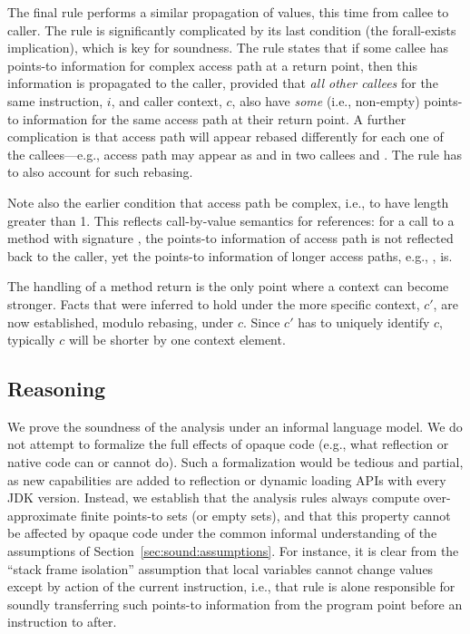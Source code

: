 The final rule performs a similar propagation of values, this time from callee to caller. The rule is significantly complicated by its last condition (the forall-exists implication), which is key for soundness. The rule states that if some callee has points-to information for complex access path  at a return point, then this information is propagated to the caller, provided that \todo{} \emph{all other callees} for the same instruction, $i$, and caller context, $c$, also have \emph{some} (i.e., non-empty) points-to information for the same access path  at their return point. A further complication is that access path  will appear rebased differently for each one of the callees---e.g., access path  may appear as  and  in two callees  and . The rule has to also account for such rebasing.

Note also the earlier condition that access path  be complex, i.e., to have length greater than 1. This reflects call-by-value semantics for references: for a call  to a method with signature , the points-to information of access path  is not reflected back to the caller, yet the points-to information of longer access paths, e.g., , is.

The handling of a method return is the only point where a context can become stronger. Facts that were inferred to hold under the more specific context, $c'$, are now established, modulo rebasing, under $c$. Since $c'$ has to uniquely identify $c$, typically $c$ will be shorter by one context element.


\subsection{Reasoning}
\label{sec:sound:reasoning}

We prove the soundness of the analysis under an informal language model. We do not attempt to formalize the full effects of opaque code (e.g., what reflection or native code can or cannot do). Such a formalization would be tedious and partial, as new capabilities are added to reflection or dynamic loading APIs with every JDK version. Instead, we establish that the analysis rules always compute over-approximate finite points-to sets (or empty sets), and that this property cannot be affected by opaque code under the common informal understanding of the assumptions of Section~\ref{sec:sound:assumptions}. For instance, it is clear from the ``stack frame isolation'' assumption that local variables cannot change values except by action of the current instruction, i.e., that rule  is alone responsible for soundly transferring such points-to information from the program point before an instruction to after.

